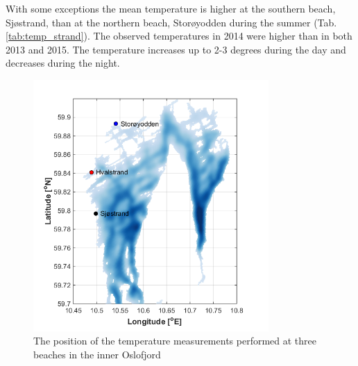 \documentclass[12pt,a4paper,english]{article}
\begin{document}
With some exceptions the mean temperature is higher at the southern beach, Sj\o strand, than at the northern beach, Stor\o yodden during the summer (Tab. \ref{tab:temp_strand}). The observed temperatures in 2014 were higher than in both 2013 and 2015. The temperature increases up to 2-3 degrees during the day and decreases during the night.

\begin{figure}[ht]
\centerline{
\includegraphics*[trim=0 0 0 0,clip=true,width=0.8\textwidth]{Figurer/badestrand_kart.png}
}
\caption{\small
The position of the temperature measurements performed at three beaches in the inner Oslofjord}
\label{fig:kart_strand}
\end{figure}
\end{document}

